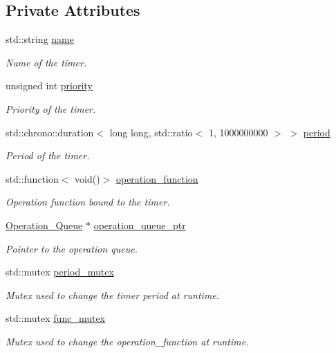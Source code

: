 \subsection*{Private Attributes}
\begin{DoxyCompactItemize}
\item 
std\+::string \hyperlink{classzcm_1_1Timer_abfd2bb014b496ce2eda5a5837e9275f1}{name}
\begin{DoxyCompactList}\small\item\em Name of the timer. \end{DoxyCompactList}\item 
unsigned int \hyperlink{classzcm_1_1Timer_a722f6390254d106117d8e1545b6092ab}{priority}
\begin{DoxyCompactList}\small\item\em Priority of the timer. \end{DoxyCompactList}\item 
std\+::chrono\+::duration$<$ long long, std\+::ratio$<$ 1, 1000000000 $>$ $>$ \hyperlink{classzcm_1_1Timer_a36c7498a7ad5706ceca83429e6c1759c}{period}
\begin{DoxyCompactList}\small\item\em Period of the timer. \end{DoxyCompactList}\item 
std\+::function$<$ void()$>$ \hyperlink{classzcm_1_1Timer_a07f820c2d67029b83547bbfd77fc3690}{operation\+\_\+function}
\begin{DoxyCompactList}\small\item\em Operation function bound to the timer. \end{DoxyCompactList}\item 
\hyperlink{classzcm_1_1Operation__Queue}{Operation\+\_\+\+Queue} $\ast$ \hyperlink{classzcm_1_1Timer_a9f2ce34fb9230c4251355fde956b7220}{operation\+\_\+queue\+\_\+ptr}
\begin{DoxyCompactList}\small\item\em Pointer to the operation queue. \end{DoxyCompactList}\item 
std\+::mutex \hyperlink{classzcm_1_1Timer_af9d6ce4df403e44b543241926ddcf41f}{period\+\_\+mutex}
\begin{DoxyCompactList}\small\item\em Mutex used to change the timer period at runtime. \end{DoxyCompactList}\item 
std\+::mutex \hyperlink{classzcm_1_1Timer_a987e7fd6128be8eac6a6a3d60c7ef9b3}{func\+\_\+mutex}
\begin{DoxyCompactList}\small\item\em Mutex used to change the operation\+\_\+function at runtime. \end{DoxyCompactList}\end{DoxyCompactItemize}


